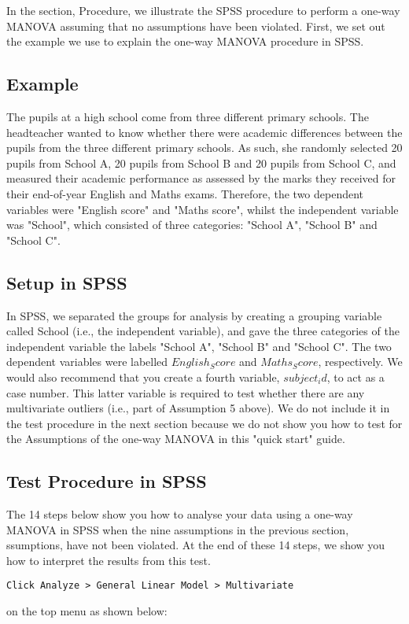 \documentclass[12pt]{article} %
\begin{document}
In the section, Procedure, we illustrate the SPSS procedure to perform a one-way MANOVA assuming that no assumptions have been violated. First, we set out the example we use to explain the one-way MANOVA procedure in SPSS.



\subsection{Example}
The pupils at a high school come from three different primary schools. The headteacher wanted to know whether there were academic differences between the pupils from the three different primary schools. As such, she randomly selected 20 pupils from School A, 20 pupils from School B and 20 pupils from School C, and measured their academic performance as assessed by the marks they received for their end-of-year English and Maths exams. Therefore, the two dependent variables were "English score" and "Maths score", whilst the independent variable was "School", which consisted of three categories: "School A", "School B" and "School C".


\subsection{Setup in SPSS}
In SPSS, we separated the groups for analysis by creating a grouping variable called School (i.e., the independent variable), and gave the three categories of the independent variable the labels "School A", "School B" and "School C". The two dependent variables were labelled $English_Score$ and $Maths_Score$, respectively. We would also recommend that you create a fourth variable, $subject_id$, to act as a case number. This latter variable is required to test whether there are any multivariate outliers (i.e., part of Assumption 5 above). We do not include it in the test procedure in the next section because we do not show you how to test for the  Assumptions of the one-way MANOVA in this "quick start" guide. 




\subsection{Test Procedure in SPSS}
The 14 steps below show you how to analyse your data using a one-way MANOVA in SPSS when the nine assumptions in the previous section, ssumptions, have not been violated. At the end of these 14 steps, we show you how to interpret the results from this test.
\begin{verbatim}
Click Analyze > General Linear Model > Multivariate
\end{verbatim}
on the top menu as shown below:
\end{document}
